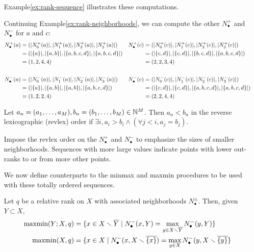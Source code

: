 \documentclass[
]{article}
\begin{document}
Example\nbs\ref{ex:rank-sequence} illustrates these computations.

\begin{example}\label{ex:rank-sequence}
Continuing Example\nbs\ref{ex:rank-neighborhoods}, we can compute the other $N_\bullet^+$ and $N_\bullet^-$ for $a$ and $c$:
\begin{align*}
    N_\bullet^+ (a) &= (\lvert N^+_0(a)\rvert, \lvert N^+_1(a)\rvert, \lvert N^+_2(a)\rvert, \lvert N^+_3(a)\rvert) &
    N_\bullet^+ (c) &= (\lvert N^+_0(c)\rvert, \lvert N^+_1(c)\rvert, \lvert N^+_2(c)\rvert, \lvert N^+_3(c)\rvert) \\
    &= (\lvert \{a\}\rvert, \lvert \{a, b\}\rvert, \lvert \{a, b, c, d\}\rvert, \lvert \{a, b, c, d\}\rvert) &
    &= (\lvert \{c, d\}\rvert, \lvert \{c, d\}\rvert, \lvert \{b, c, d\}\rvert, \lvert \{a, b, c, d\}\rvert) \\
    &= (1, 2, 4, 4) &
    &= (2, 2, 3, 4) \\
    \\
    N_\bullet^- (a) &= (\lvert N^-_0(a)\rvert, \lvert N^-_1(a)\rvert, \lvert N^-_2(a)\rvert, \lvert N^-_3(a)\rvert) &
    N_\bullet^- (c) &= (\lvert N^-_0(c)\rvert, \lvert N^-_1(c)\rvert, \lvert N^-_2(c)\rvert, \lvert N^-_3(c)\rvert) \\
    &= (\lvert \{a\}\rvert, \lvert \{a, b\}\rvert, \lvert \{a, b\}\rvert, \lvert \{a, b, c, d\}\rvert) &
    &= (\lvert \{c, d\}\rvert, \lvert \{c, d\}\rvert, \lvert \{a, b, c, d\}\rvert, \lvert \{a, b, c, d\}\rvert) \\
    &= (1, 2, 2, 4) &
    &= (2, 2, 4, 4)
\end{align*}
\end{example}

\begin{definition}
    Let $a_n = (a_1,\ldots,a_M),b_n = (b_1,\ldots,b_M)\in\mathbb{N}^M$.
    Then $a_n < b_n$ in the reverse lexicographic (revlex) order if $\exists i, a_i > b_i \wedge (\forall j<i, a_j = b_j)$.
\end{definition}

Impose the revlex order on the \(N_\bullet^+\) and \(N_\bullet^-\) to
emphasize the sizes of smaller neighborhoods. Sequences with more large
values indicate points with lower out-ranks to or from more other
points.

We now define counterparts to the minmax and maxmin procedures to be
used with these totally ordered sequences.

\begin{lemma}
    Let $q$ be a relative rank on $X$ with associated neighborhoods $N_\bullet^\pm$.
    Then, given $Y\subset X$,
    \begin{align*}
        \operatorname{maxmin}(Y;X,q) &= \{x\in X\smallsetminus \overline{Y}\mid N_\bullet^-(x,Y) = \max_{y\in X\smallsetminus \overline{Y}}{N_\bullet^-(y,Y)}\} \\
        \operatorname{maxmin}(X,q) &= \{x\in X\mid N_\bullet^-(x,X \smallsetminus \overline{\{x\}}) = \max_{y\in X}{N_\bullet^-(y,X \smallsetminus \overline{\{y\}}}\}
    \end{align*}
\end{lemma}
\end{document}
